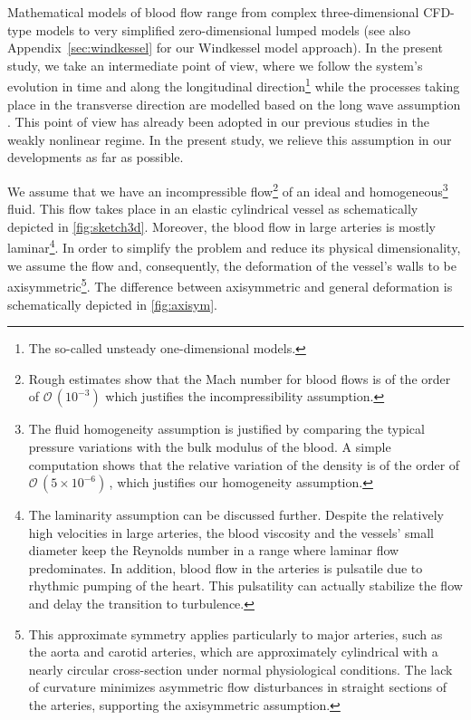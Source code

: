 \documentclass[alpha-refs, 12pt]{wiley-article}
\renewcommand{\O}{\mathcal{O}}
\begin{document}
Mathematical models of blood flow range from complex three-dimensional CFD-type models \citep{Roe2005} to very simplified zero-dimensional lumped models \citep{Milisic2004, Alastruey2008} (see also Appendix~\ref{sec:windkessel} for our Windkessel model approach). In the present study, we take an intermediate point of view, where we follow the system's evolution in time and along the longitudinal direction\footnote{The so-called unsteady one-dimensional models.} \citep{Sherwin2003, Alastruey2011} while the processes taking place in the transverse direction are modelled based on the long wave assumption \citep{Lavrentiev1947, Serre1956, BCL, Khakimzyanov2019}. This point of view has already been adopted in our previous studies \citep{Mitsotakis2018, Mitsotakis2019} in the weakly nonlinear regime. In the present study, we relieve this assumption in our developments as far as possible.

We assume that we have an incompressible flow\footnote{Rough estimates show that the Mach number for blood flows is of the order of $\O\,(10^{-3})$ which justifies the incompressibility assumption.} of an ideal and homogeneous\footnote{The fluid homogeneity assumption is justified by comparing the typical pressure variations with the bulk modulus of the blood. A simple computation shows that the relative variation of the density is of the order of $\O\,(5\times 10^{-6})\,$, which justifies our homogeneity assumption.} fluid. This flow takes place in an elastic cylindrical vessel as schematically depicted in \cref{fig:sketch3d}. Moreover, the blood flow in large arteries is mostly laminar\footnote{The laminarity assumption can be discussed further. Despite the relatively high velocities in large arteries, the blood viscosity and the vessels' small diameter keep the Reynolds number in a range where laminar flow predominates. In addition, blood flow in the arteries is pulsatile due to rhythmic pumping of the heart. This pulsatility can actually stabilize the flow and delay the transition to turbulence.}. In order to simplify the problem and reduce its physical dimensionality, we assume the flow and, consequently, the deformation of the vessel's walls to be axisymmetric\footnote{This approximate symmetry applies particularly to major arteries, such as the aorta and carotid arteries, which are approximately cylindrical with a nearly circular cross-section under normal physiological conditions. The lack of curvature minimizes asymmetric flow disturbances in straight sections of the arteries, supporting the axisymmetric assumption.}. The difference between axisymmetric and general deformation is schematically depicted in \cref{fig:axisym}. 
\end{document}
